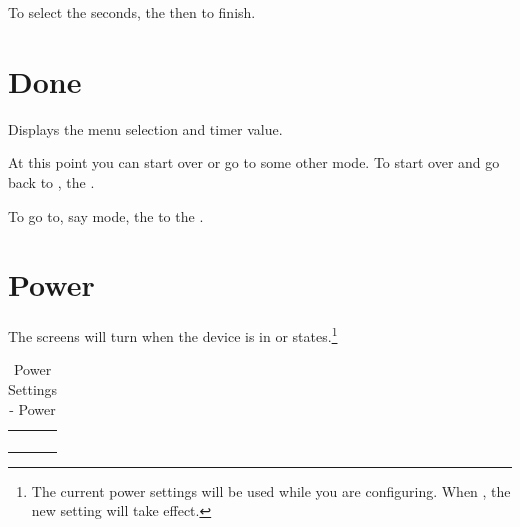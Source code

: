 To select the seconds,  the  then  to finish.


\section{Done} 

Displays the menu selection and timer value.

\par\medskip

At this point you can start over or go to some other mode.  To start over and go
back to ,  the .


To go to, say  mode,  the  to the .


\section{Power}

The screens will turn  when the device is in  or 
states.\footnote{ The current power settings will be used while you are
configuring.  When , the new setting will take effect.}

\begin{table}[H]
\centering
\begin{tabu}{ X[1,c,m] | X[1,c,m] | X[1,c,m] }
  \thrule
   &  &  \\ \mrule

   & 
    &  \\ 
   & & \\

  \bhrule
\end{tabu}
\caption {Power Settings - Power}
\end{table}

